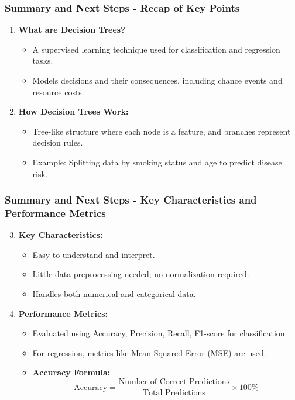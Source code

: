 \documentclass[aspectratio=169]{beamer}
\begin{document}
\begin{frame}[fragile]
    \frametitle{Summary and Next Steps - Recap of Key Points}
    
    \begin{enumerate}
        \item \textbf{What are Decision Trees?}
        \begin{itemize}
            \item A supervised learning technique used for classification and regression tasks.
            \item Models decisions and their consequences, including chance events and resource costs.
        \end{itemize}
        
        \item \textbf{How Decision Trees Work:}
        \begin{itemize}
            \item Tree-like structure where each node is a feature, and branches represent decision rules.
            \item Example: Splitting data by smoking status and age to predict disease risk.
        \end{itemize}
    \end{enumerate}
\end{frame}

\begin{frame}[fragile]
    \frametitle{Summary and Next Steps - Key Characteristics and Performance Metrics}

    \begin{enumerate}
        \setcounter{enumi}{2} %
        \item \textbf{Key Characteristics:}
        \begin{itemize}
            \item Easy to understand and interpret.
            \item Little data preprocessing needed; no normalization required.
            \item Handles both numerical and categorical data.
        \end{itemize}

        \item \textbf{Performance Metrics:}
        \begin{itemize}
            \item Evaluated using Accuracy, Precision, Recall, F1-score for classification.
            \item For regression, metrics like Mean Squared Error (MSE) are used.
            \item \textbf{Accuracy Formula:}
            \begin{equation}
                \text{Accuracy} = \frac{\text{Number of Correct Predictions}}{\text{Total Predictions}} \times 100\%
            \end{equation}
        \end{itemize}
    \end{enumerate}
\end{frame}
\end{document}

